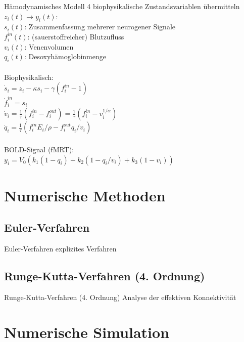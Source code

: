 \documentclass{beamer}
\begin{document}
\begin{frame}{Hämodynamisches Modell}
4 biophysikalische Zustandsvariablen übermitteln $z_i(t)\rightarrow y_i(t)$:\\
$s_i(t)$: Zusammenfassung mehrerer neurogener Signale\\$ f^{in}_i(t)$: (sauerstoffreicher) Blutzufluss \\$ v_i(t)$: Venenvolumen \\$ q_i(t)$: Desoxyhämoglobinmenge~\\~\\
Biophysikalisch:~\\
$\dot{s}_i=z_i-\kappa s_i -\gamma (f^{in}_i-1)$\\
$\dot{f}^{in}_i=s_i$\\
$\dot{v}_i=\frac{1}{\tau}(f^{in}_i-f^{out}_i)=\frac{1}{\tau}(f^{in}_i-v_i^{1/\alpha})$\\
$\dot{q}_i=\frac{1}{\tau}(f^{in}_iE_i/\rho-f^{out}_iq_i/v_i)$\\~\\
BOLD-Signal (fMRT):\\ $y_i=V_0(k_1(1-q_i)+k_2(1-q_i/v_i)+k_3(1-v_i))$
\end{frame}

\section{Numerische Methoden}
\subsection{Euler-Verfahren}
	\begin{frame}{Euler-Verfahren}
		explizites Verfahren
	\end{frame}
	
\subsection{Runge-Kutta-Verfahren (4. Ordnung)}
	\begin{frame}{Runge-Kutta-Verfahren (4. Ordnung)}
		Analyse der effektiven Konnektivität
	\end{frame}

\section{Numerische Simulation}
\end{document}

